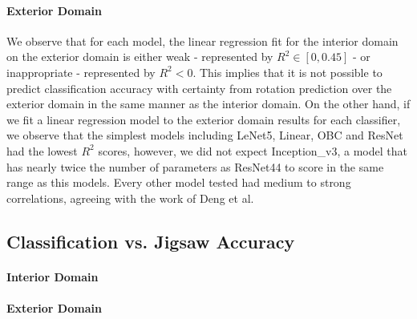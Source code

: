 \documentclass{article}
\begin{document}
\paragraph{Exterior Domain} We observe that for each model, the linear regression fit for the interior domain on the exterior domain is either weak - represented by $R^2 \in [0, 0.45]$ - or inappropriate - represented by $R^2 < 0$. This implies that it is not possible to predict classification accuracy with certainty from rotation prediction over the exterior domain in the same manner as the interior domain. On the other hand, if we fit a linear regression model to the exterior domain results for each classifier, we observe that the simplest models including LeNet5, Linear, OBC and ResNet had the lowest $R^2$ scores, however, we did not expect Inception\_v3, a model that has nearly twice the number of parameters as ResNet44 to score in the same range as this models. Every other model tested had medium to strong correlations, agreeing with the work of Deng et al. \cite{Deng:ICML2021}

\subsection{Classification vs. Jigsaw Accuracy}\label{cvja}
\paragraph{Interior Domain}
\paragraph{Exterior Domain}
\end{document}
